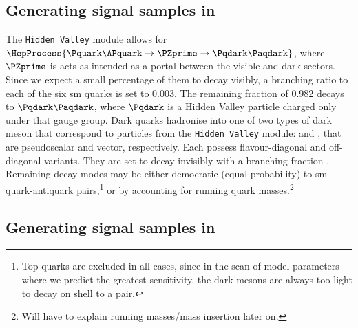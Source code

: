 

\subsection{Generating signal samples in \texorpdfstring{\PYTHIA}{Pythia}}
\label{subsec:svj_signal_pythia}

The \texttt{Hidden Valley} module allows for $\HepProcess{\Pquark\APquark \to \PZprime \to \Pqdark\Paqdark}$, where $\PZprime$ is acts as intended as a portal between the visible and dark sectors. Since we expect a small percentage of them to decay visibly, a branching ratio to each of the six \acrshort{sm} quarks is set to 0.003. The remaining fraction of 0.982 decays to $\Pqdark\Paqdark$, where $\Pqdark$ is a Hidden Valley particle charged only under that gauge group. Dark quarks hadronise into one of two types of dark meson that correspond to particles from the \texttt{Hidden Valley} module: \Ppidark and \Prhodark, that are pseudoscalar and vector, respectively. Each possess flavour-diagonal and off-diagonal variants. They are set to decay invisibly with a branching fraction \rinv. Remaining decay modes may be either democratic (equal probability) to \acrshort{sm} quark-antiquark pairs,\footnote{Top quarks are excluded in all cases, since in the scan of model parameters where we predict the greatest sensitivity, the dark mesons are always too light to decay on shell to a \ttbar pair.} or by accounting for running quark masses.\footnote{Will have to explain running masses/mass insertion later on.}





\subsection{Generating signal samples in \texorpdfstring{\MADGRAPH}{MadGraph}}
\label{subsec:svj_signal_madgraph}




